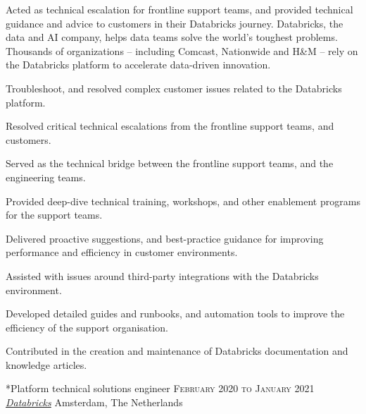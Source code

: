\documentclass[10pt, a4paper, final]{article}
\begin{document}
\begin{section}
\begin{subsection}
    Acted as technical escalation for frontline support teams, and provided technical guidance and advice to customers in their Databricks journey. Databricks, the data and AI company, helps data teams solve the world's toughest problems. Thousands of organizations -- including Comcast, Nationwide and H{\&}M -- rely on the Databricks platform to accelerate data-driven innovation.
    \vspace{1em}
    \begin{compactitem}
      \item Troubleshoot, and resolved complex customer issues related to the Databricks platform.
      \item Resolved critical technical escalations from the frontline support teams, and customers.
      \item Served as the technical bridge between the frontline support teams, and the engineering teams.
      \item Provided deep-dive technical training, workshops, and other enablement programs for the support teams.
      \item Delivered proactive suggestions, and best-practice guidance for improving performance and efficiency in customer environments.
      \item Assisted with issues around third-party integrations with the Databricks environment.
      \item Developed detailed guides and runbooks, and automation tools to improve the efficiency of the support organisation.
      \item Contributed in the creation and maintenance of Databricks documentation and knowledge articles.
      
    \end{compactitem}
  \end{subsection}
  \vspace{2em}

  \begin{subsection}*{Platform technical solutions engineer \hfill\textsc{February 2020 to January 2021}}
    \href{https://databricks.com/}{\textit{Databricks}} \hfill Amsterdam, The Netherlands
    \vspace{1em}


\end{subsection}
\end{section}
\end{document}
